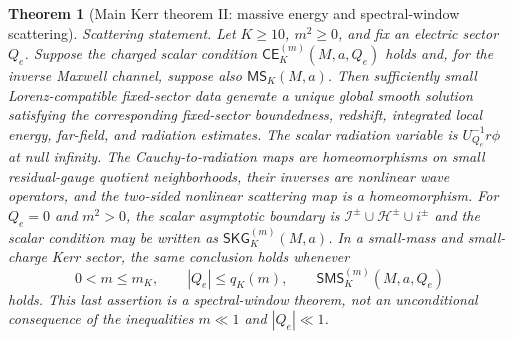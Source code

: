 \documentclass[11pt]{article}
\numberwithin{equation}{section}
\theoremstyle{plain}
\newtheorem{theorem}{Theorem}[section]
\theoremstyle{definition}
\theoremstyle{remark}
\newcommand{\SKG}{\mathsf{SKG}}
\newcommand{\CElec}{\mathsf{CE}}
\newcommand{\MScat}{\mathsf{MS}}
\newcommand{\SMS}{\mathsf{SMS}}
\begin{document}
\begin{theorem}[Main Kerr theorem II: massive energy and spectral-window scattering]
\emph{Scattering statement.}  Let \(K\ge10\), \(m^2\ge0\), and fix an electric sector \(Q_e\).  Suppose the charged scalar condition \(\CElec_K^{(m)}(M,a,Q_e)\) holds and, for the inverse Maxwell channel, suppose also \(\MScat_K(M,a)\).  Then sufficiently small Lorenz-compatible fixed-sector data generate a unique global smooth solution satisfying the corresponding fixed-sector boundedness, redshift, integrated local energy, far-field, and radiation estimates.  The scalar radiation variable is \(U_{Q_e}^{-1}r\phi\) at null infinity.  The Cauchy-to-radiation maps are homeomorphisms on small residual-gauge quotient neighborhoods, their inverses are nonlinear wave operators, and the two-sided nonlinear scattering map is a homeomorphism.  For \(Q_e=0\) and \(m^2>0\), the scalar asymptotic boundary is \(\mathcal I^\pm\cup\mathcal H^\pm\cup i^\pm\) and the scalar condition may be written as \(\SKG_K^{(m)}(M,a)\).  In a small-mass and small-charge Kerr sector, the same conclusion holds whenever
\begin{equation}\label{eq:kerr-small-mass-charge-window}
 0<m\le m_K,
 \qquad
 |Q_e|\le q_K(m),
 \qquad
 \SMS_K^{(m)}(M,a,Q_e)
\end{equation}
holds.  This last assertion is a spectral-window theorem, not an unconditional consequence of the inequalities \(m\ll1\) and \(|Q_e|\ll1\).
\end{theorem}
\end{document}
